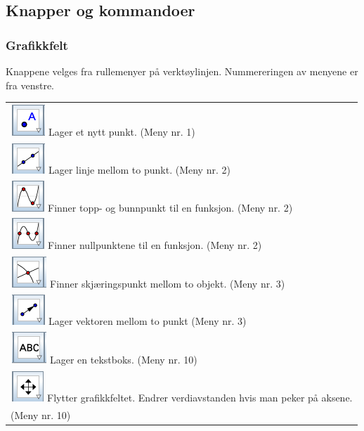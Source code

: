 \newpage
\subsection{Knapper og kommandoer}

\subsubsection*{Grafikkfelt}
Knappene velges fra rullemenyer på verktøylinjen. Nummereringen av menyene er fra venstre.\vsk

\begin{tabular}{@{}l}
	\,\includegraphics[scale=0.4]{fig/pkt} Lager et nytt punkt. (Meny nr. 1) \\
	\,\includegraphics[scale=0.4]{fig/lin} Lager linje mellom to punkt. (Meny nr. 2)\\	
	\,\includegraphics[scale=0.4]{fig/ekst} Finner topp- og bunnpunkt til en funksjon. (Meny nr. 2)\\
	\,\includegraphics[scale=0.4]{fig/nul} Finner nullpunktene til en funksjon. (Meny nr. 2)	\\
	\,\includegraphics[scale=0.4]{fig/skj} Finner skjæringspunkt mellom to objekt. (Meny nr. 3)\\	
	\,\includegraphics[scale=0.4]{fig/vek} Lager vektoren mellom to punkt (Meny nr. 3)\\		
	\,\includegraphics[scale=0.4]{fig/tekst} Lager en tekstboks. (Meny nr. 10)\\		
	\,\includegraphics[scale=0.4]{fig/flytt} Flytter grafikkfeltet. Endrer verdiavstanden hvis man peker på aksene. \\
	\hspace{1cm}(Meny nr. 10)\\			
\end{tabular}

